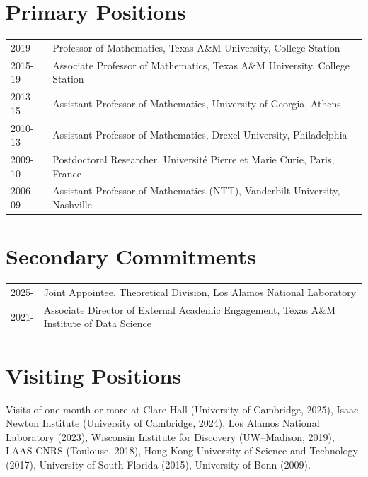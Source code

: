 \documentclass[11pt]{article}
\begin{document}
\section{Primary Positions}
\begin{tabular}{ll}

2019- & Professor of Mathematics, Texas A\&M University, College Station\\
2015-19 & Associate Professor of Mathematics, Texas A\&M University, College Station\\
2013-15 & Assistant Professor of Mathematics, University of Georgia, Athens\\
2010-13 & Assistant Professor of Mathematics,  Drexel University, Philadelphia\\
2009-10 & Postdoctoral Researcher,  Universit\'{e} Pierre et Marie Curie, Paris, France\\
2006-09 & Assistant Professor of Mathematics (NTT),  Vanderbilt University, Nashville
\end{tabular}


\section{Secondary Commitments} %
\begin{tabular}{ll}
2025-  & Joint Appointee,  Theoretical Division, Los Alamos National Laboratory\\
2021-  & Associate Director of External Academic Engagement, Texas A\&M Institute of Data Science
\end{tabular}


\section{Visiting Positions}
Visits of one month or more at
Clare Hall (University of Cambridge, 2025),
Isaac Newton Institute (University of Cambridge, 2024),
Los Alamos National Laboratory (2023),
Wisconsin Institute for Discovery (UW--Madison, 2019),
LAAS-CNRS (Toulouse, 2018),
Hong Kong University of Science and Technology (2017),
University of South Florida (2015),
University of Bonn (2009).
\end{document}

